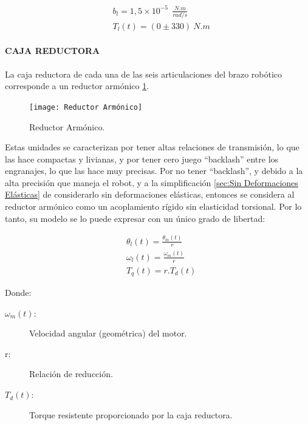 \documentclass{article}
\begin{document}
\begin{sloppypar}
\begin{subequations} \label{eq:Valor de b_l y de b_l}
    \begin{align}
        & \label{eq:Valor de b_l}  b_l=1,5\times10^{-5}\ \ \frac{N.m}{rad/s}
        \\
        & \label{eq:Valor de T_l}  T_l(t)=(0\pm330)\ N.m
    \end{align}
\end{subequations}






\paragraph{CAJA REDUCTORA}
\label{sec:CAJA REDUCTORA}
\hfill

\hfill


La caja reductora de cada una de las seis articulaciones del brazo robótico corresponde a un reductor armónico \ref{fig:Reductor Armónico}.

\begin{figure}[H]
    \centering
    \texttt{[image: Reductor Armónico]}
    \caption{Reductor Armónico.}
    \label{fig:Reductor Armónico}
\end{figure}

Estas unidades se caracterizan por tener altas relaciones de transmisión, lo que las hace compactas y livianas, y por tener cero juego “backlash” entre los engranajes, lo que las hace muy precisas.
Por no tener “backlash”, y debido a la alta precisión que maneja el robot, y a la simplificación \ref{sec:Sin Deformaciones Elásticas} de considerarlo sin deformaciones elásticas, entonces se considera al reductor armónico como un acoplamiento rígido sin elasticidad torsional. Por lo tanto, su modelo se lo puede expresar con un único grado de libertad:

\begin{subequations} \label{eq:theta_l, omega_l y T_q}
    \begin{align}
        & \label{eq:theta_l}   \theta_l(t)=\frac{\theta_m(t)}{r}
        \\
        & \label{eq:omega_l}   \omega_l(t)=\frac{\omega_m(t)}{r}
        \\
        & \label{eq:T_q}   T_q(t)=r.T_d(t)
    \end{align}
\end{subequations}

Donde:
\begin{description}
    \item[$\omega_m\left(t\right):$] Velocidad angular (geométrica) del motor.
    \item[r:] Relación de reducción.
    \item[$T_d(t):$] Torque resistente proporcionado por la caja reductora.
\end{description}


\end{sloppypar}
\end{document}
